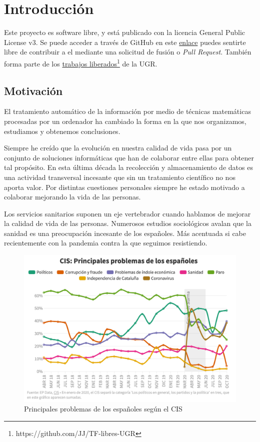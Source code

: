 \chapter{Introducción}
Este proyecto es software libre, y está publicado con la licencia \cite{gplv3} General Public License v3.
Se puede acceder a través de GitHub en este \href{https://github.com/pablojjimenez/TFG}{enlace} puedes sentirte libre de contribuir a 
el mediante una solicitud de fusión o \textit{Pull Request}. También forma parte de los \href{https://github.com/JJ/TF-libres-UGR}{trabajos liberados}\footnote{https://github.com/JJ/TF-libres-UGR} de la UGR.

\section{Motivación} 
El tratamiento automático de la información por medio de técnicas matemáticas procesadas por un ordenador 
ha cambiado la forma en la que nos organizamos, estudiamos y obtenemos conclusiones.

Siempre he creído que la evolución en nuestra calidad de vida pasa por un
conjunto de soluciones informáticas que han de colaborar entre ellas para obtener tal propósito. 
En esta última década la recolección y almacenamiento de datos es una actividad transversal incesante 
que sin un tratamiento científico no nos aporta valor. Por distintas cuestiones personales siempre he 
estado motivado a colaborar mejorando la vida de las personas. 

Los servicios sanitarios suponen un eje vertebrador cuando hablamos de mejorar la calidad
de vida de las personas. Numerosos estudios sociológicos avalan que la sanidad es una 
preocupación incesante de los españoles. Más acentuada si cabe recientemente con la 
pandemia contra la que seguimos resistiendo.
\begin{figure}[]
	\centering	
	\includegraphics[scale=0.5]{doc/logos/imgs/CIS_1.png}
	\caption{ \cite{rtve-cis}  Principales problemas de los españoles según el CIS }
    \label{fig:worst_f_value}
\end{figure}


